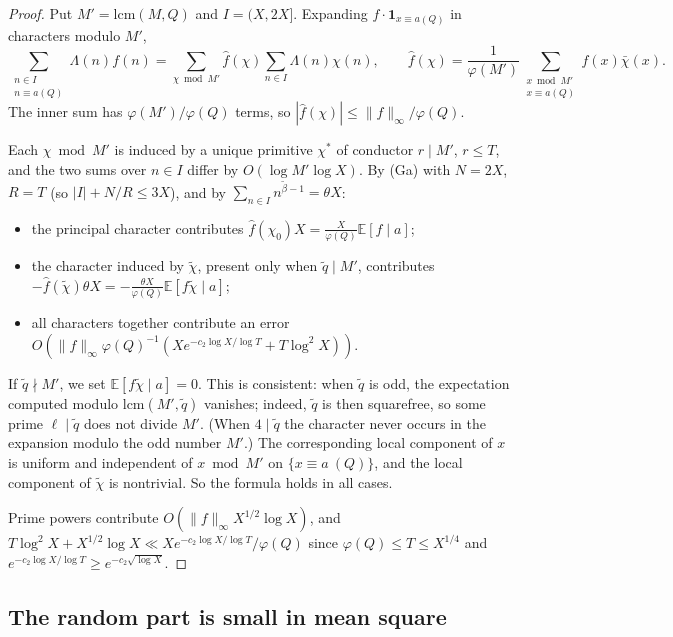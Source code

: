 \documentclass[11pt]{amsart}
\theoremstyle{remark}
\newcommand{\E}{\mathbb{E}}
\begin{document}
\begin{proof}
Put $M'=\mathrm{lcm}(M,Q)$ and $I=(X,2X]$. Expanding $f\cdot\mathbf 1_{x\equiv a(Q)}$ in characters modulo $M'$,
\[
\sum_{\substack{n\in I\\ n\equiv a(Q)}}\Lambda(n)f(n)=\sum_{\chi\bmod M'}\hat f(\chi)\sum_{n\in I}\Lambda(n)\chi(n),\qquad\hat f(\chi)=\frac1{\varphi(M')}\sum_{\substack{x\bmod M'\\ x\equiv a(Q)}}f(x)\bar\chi(x).
\]
The inner sum has $\varphi(M')/\varphi(Q)$ terms, so $|\hat f(\chi)|\le\|f\|_\infty/\varphi(Q)$.

Each $\chi\bmod M'$ is induced by a unique primitive $\chi^*$ of conductor $r\mid M'$, $r\le T$, and the two sums over $n\in I$ differ by $O(\log M'\log X)$. By (Ga) with $N=2X$, $R=T$ (so $|I|+N/R\le3X$), and by $\sum_{n\in I}n^{\tilde\beta-1}=\theta X$:
\begin{itemize}
\item the principal character contributes $\hat f(\chi_0)X=\frac X{\varphi(Q)}\E[f\mid a]$;
\item the character induced by $\tilde\chi$, present only when $\tilde q\mid M'$, contributes $-\hat f(\tilde\chi)\theta X=-\frac{\theta X}{\varphi(Q)}\E[f\tilde\chi\mid a]$;
\item all characters together contribute an error $O(\|f\|_\infty\varphi(Q)^{-1}(Xe^{-c_2\log X/\log T}+T\log^2X))$.
\end{itemize}
If $\tilde q\nmid M'$, we set $\E[f\tilde\chi\mid a]=0$. This is consistent: when $\tilde q$ is odd, the expectation computed modulo $\mathrm{lcm}(M',\tilde q)$ vanishes; indeed, $\tilde q$ is then squarefree, so some prime $\ell\mid\tilde q$ does not divide $M'$. (When $4\mid\tilde q$ the character never occurs in the expansion modulo the odd number $M'$.) The corresponding local component of $x$ is uniform and independent of $x\bmod M'$ on $\{x\equiv a\ (Q)\}$, and the local component of $\tilde\chi$ is nontrivial. So the formula holds in all cases.

Prime powers contribute $O(\|f\|_\infty X^{1/2}\log X)$, and $T\log^2X+X^{1/2}\log X\ll Xe^{-c_2\log X/\log T}/\varphi(Q)$ since $\varphi(Q)\le T\le X^{1/4}$ and $e^{-c_2\log X/\log T}\ge e^{-c_2\sqrt{\log X}}$.
\end{proof}

\subsection{The random part is small in mean square}
\end{document}

